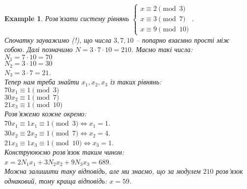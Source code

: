 \documentclass[a4paper, 14pt]{extarticle}
\theoremstyle{theoremdd}
\theoremstyle{theoremdd}
\theoremstyle{theoremdd}
\theoremstyle{theoremdd}
\newtheorem{example}[theorem]{Example}
\theoremstyle{theoremdd}
\theoremstyle{theoremdd}
\theoremstyle{theoremdd}
\theoremstyle{theoremdd}
\begin{document}
\begin{example}
Розв'язати систему рівнянь $\begin{cases} 
x \equiv 2 \pmod 3 \\
x \equiv 3 \pmod 7 \\
x  \equiv 9 \pmod {10}
 \end{cases}$.\\
Спочатку зауважимо (!), що числа $3,7,10$ -- попарно взаємно прості між собою. Далі позначимо $N = 3 \cdot 7 \cdot 10 = 210$. Маємо такі числа: \\$N_1 = 7 \cdot 10 = 70$ \\
$N_2 = 3 \cdot 10 = 30$ \\
$N_3 = 3 \cdot 7 = 21$. \\
Тепер нам треба знайти $x_1,x_2,x_3$ із таких рівнянь:\\
$70x_1 \equiv 1 \pmod 3$\\
$30x_2 \equiv 1 \pmod 7$\\
$21x_3 \equiv 1 \pmod {10}$\\
Розв'яжемо кожне окремо:\\
$70x_1 \equiv 1x_1 \equiv 1 \pmod 3 \iff x_1 = 1$.\\
$30x_2 \equiv 2x_2 \equiv 1 \pmod 7 \iff x_2 = 4$.\\
$21x_3 \equiv 1x_3 \equiv 1 \pmod {10} \iff x_3 = 1$.\\
Конструююємо розв'язок таким чином:\\
$x = 2N_1x_1 + 3N_2x_2 + 9N_3x_3 = 689$.\\
Можна залишити таку відповідь, але ми знаємо, що за модулем $210$ розв'язок однаковий, тому краща відповідь: $x = 59$.
\end{example}
\end{document}
